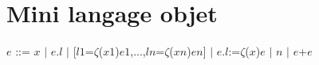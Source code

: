 
\chapter{Mini langage objet}

$e$ ::= $x$ $|$ $e$.$l$ $|$ [$l1$=$\zeta$($x1$)$e1$,...,$ln$=$\zeta$($xn$)$en$] $|$ $e$.$l$:=$\zeta$($x$)$e$ $|$ $n$ $|$ $e$+$e$
